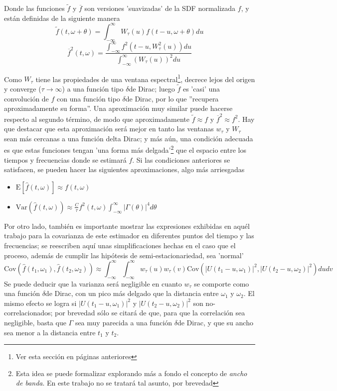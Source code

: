 \documentclass[12pt,a4paper]{mitthesis}
\newcommand{\intR}{\int_{-\infty}^{\infty}}
\newcommand{\ddd}{$\delta$}
\newcommand{\est}[1]{\widehat{ #1 }}
\newcommand{\E}[1]{\mathrm{E}\left[ #1 \right]}
\newcommand{\Var}[1]{\mathrm{Var}\left( #1 \right)}
\newcommand{\Cov}[1]{\mathrm{Cov}\left( #1 \right)}
\newcommand{\abso}[1]{\left| #1 \right|}
\begin{document}
Donde las funciones $\widetilde{f}$ y $\overline{f}$ son versiones 'suavizadas' de la SDF 
normalizada $f$, y est\'an definidas de la siguiente manera
\begin{equation*}
\widetilde{f}(t,\omega+\theta) = 
\intR W_{\tau}(u) f(t-u,\omega+\theta) du
\end{equation*}
\begin{equation*}
\overline{f}^{2} (t,\omega) =
\frac{\intR f^{2}\left(t-u,W_{\tau}^{2}(u)\right) du}
{\intR \left( W_{\tau}(u) \right)^{2} du}
\end{equation*}

Como $W_{\tau}$ tiene las propiedades de una ventana espectral\footnote{Ver esta secci\'on en 
p\'aginas anteriores}, decrece lejos del origen y converge ($\tau \rightarrow \infty$) a una 
funci\'on tipo \ddd de Dirac; luego $\widetilde{f}$  es 'casi' una convoluci\'on de $f$ con una 
funci\'on tipo \ddd de Dirac, por lo que ''recupera aproximadamente su forma''. Una aproximaci\'on 
muy similar puede hacerse respecto al segundo t\'ermino, de modo que aproximadamente 
$\widetilde{f}\approx f$ y $\overline{f}^{2}\approx f^{2}$. Hay que destacar que esta 
aproximaci\'on ser\'a mejor en tanto las ventanas $w_{\tau}$ y $W_{\tau}$ sean m\'as cercanas a una 
funci\'on delta Dirac; y m\'as a\'un, una condici\'on adecuada es que estas funciones tengan 'una 
forma m\'as delgada'\footnote{Esta idea se puede formalizar explorando m\'as a fondo el concepto de 
\textit{ancho de banda}. En este trabajo no se tratar\'a tal asunto, por brevedad} que el espacio 
entre los tiempos y frecuencias donde se estimar\'a $f$.
Si las condiciones anteriores se satisfacen, se pueden hacer las siguientes aproximaciones, algo
m\'as arriesgadas
\begin{itemize}
\item $\displaystyle \E{\est{f}(t,\omega)} \approx f(t,\omega)$
\item $\displaystyle \Var{\est{f}(t,\omega)} \approx 
\frac{C}{\tau} f^{2}(t,\omega) \intR \abso{\Gamma (\theta)}^{4} d\theta$
\end{itemize}

Por otro lado, tambi\'en es importante mostrar las expresiones exhibidas en aqu\'el trabajo para la 
covarianza de este estimador en diferentes puntos del tiempo y las frecuencias; se reescriben 
aqu\'i unas simplificaciones hechas en el caso que el proceso, adem\'as de cumplir las hip\'otesis 
de semi-estacionariedad, sea 'normal'
\begin{equation*}
\Cov{\est{f}(t_1,\omega_1) , \est{f}(t_2,\omega_2)} \approx \intR \intR
w_\tau (u) w_\tau(v) \Cov{ \abso{U(t_1-u,\omega_1)}^{2} , \abso{U(t_2-u,\omega_2)}^{2} }
du dv
\end{equation*}
Se puede deducir que la varianza ser\'a negligible en cuanto $w_\tau$ se comporte como una 
funci\'on \ddd de Dirac, con un pico m\'as delgado que la distancia entre $\omega_1$ y $\omega_2$.
El mismo efecto se logra si $\abso{U(t_1-u,\omega_1)}^{2}$ y $\abso{U(t_2-u,\omega_2)}^{2}$ son 
no-correlacionados; por brevedad s\'olo se citar\'a de \cite{Priestley65} que, para que la 
correlaci\'on sea negligible, basta que $\Gamma$ sea muy parecida a una funci\'on \ddd de Dirac, y 
que su ancho sea menor a la distancia entre $t_1$ y $t_2$.
\end{document}
